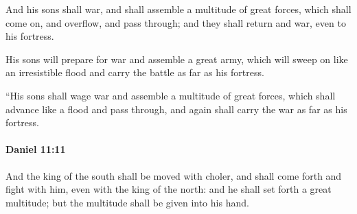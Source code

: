 			\begin{versebox}
					\item[BHS] 
					\item[LXX] 
					\item[ASV] And his sons shall war, and shall assemble a multitude of great forces, which shall come on, and overflow, and pass through; and they shall return and war, even to his fortress.
					\item[NIV] His sons will prepare for war and assemble a great army, which will sweep on like an irresistible flood and carry the battle as far as his fortress.
					\item[NRSV] “His sons shall wage war and assemble a multitude of great forces, which shall advance like a flood and pass through, and again shall carry the war as far as his fortress.
			\end{versebox}

		\paragraph{Daniel 11:11} %
			\label{DANIEL-11-11}

			And the king of the south shall be moved with choler, and shall come forth and fight with him, even with the king of the north: and he shall set forth a great multitude; but the multitude shall be given into his hand.

